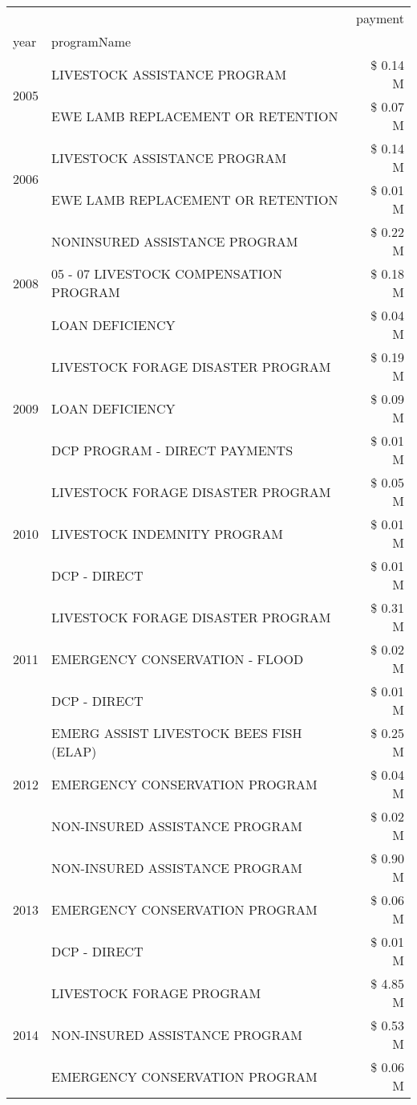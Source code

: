 \begin{tabular}{llr}
\toprule
 &  & payment \\
year & programName &  \\
\midrule
\multirow[t]{2}{*}{2005} & LIVESTOCK ASSISTANCE PROGRAM & \$ 0.14 M \\
 & EWE LAMB REPLACEMENT OR RETENTION & \$ 0.07 M \\
\cline{1-3}
\multirow[t]{2}{*}{2006} & LIVESTOCK ASSISTANCE PROGRAM & \$ 0.14 M \\
 & EWE LAMB REPLACEMENT OR RETENTION & \$ 0.01 M \\
\cline{1-3}
\multirow[t]{3}{*}{2008} & NONINSURED ASSISTANCE PROGRAM & \$ 0.22 M \\
 & 05 - 07 LIVESTOCK COMPENSATION PROGRAM & \$ 0.18 M \\
 & LOAN DEFICIENCY & \$ 0.04 M \\
\cline{1-3}
\multirow[t]{3}{*}{2009} & LIVESTOCK FORAGE DISASTER  PROGRAM & \$ 0.19 M \\
 & LOAN DEFICIENCY & \$ 0.09 M \\
 & DCP PROGRAM - DIRECT PAYMENTS & \$ 0.01 M \\
\cline{1-3}
\multirow[t]{3}{*}{2010} & LIVESTOCK FORAGE DISASTER PROGRAM & \$ 0.05 M \\
 & LIVESTOCK INDEMNITY PROGRAM & \$ 0.01 M \\
 & DCP - DIRECT & \$ 0.01 M \\
\cline{1-3}
\multirow[t]{3}{*}{2011} & LIVESTOCK FORAGE DISASTER PROGRAM & \$ 0.31 M \\
 & EMERGENCY CONSERVATION - FLOOD & \$ 0.02 M \\
 & DCP - DIRECT & \$ 0.01 M \\
\cline{1-3}
\multirow[t]{3}{*}{2012} & EMERG ASSIST LIVESTOCK BEES FISH (ELAP) & \$ 0.25 M \\
 & EMERGENCY CONSERVATION PROGRAM & \$ 0.04 M \\
 & NON-INSURED ASSISTANCE PROGRAM & \$ 0.02 M \\
\cline{1-3}
\multirow[t]{3}{*}{2013} & NON-INSURED ASSISTANCE PROGRAM & \$ 0.90 M \\
 & EMERGENCY CONSERVATION PROGRAM & \$ 0.06 M \\
 & DCP - DIRECT & \$ 0.01 M \\
\cline{1-3}
\multirow[t]{3}{*}{2014} & LIVESTOCK FORAGE PROGRAM & \$ 4.85 M \\
 & NON-INSURED ASSISTANCE PROGRAM & \$ 0.53 M \\
 & EMERGENCY CONSERVATION PROGRAM & \$ 0.06 M \\

\end{tabular}
